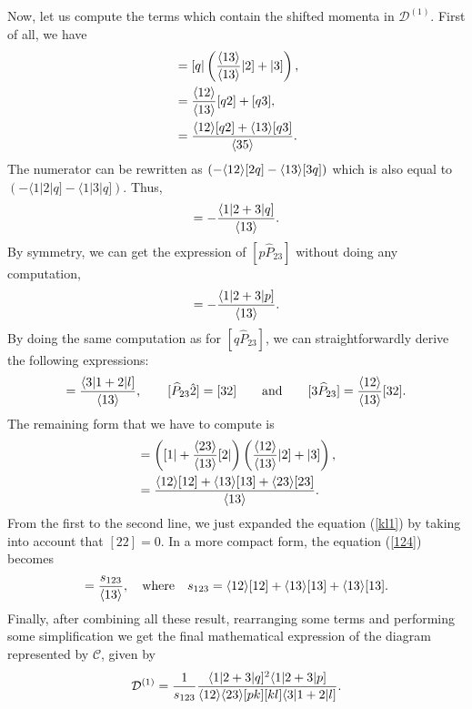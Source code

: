 Now, let us compute the terms which contain the shifted momenta in $\mathcal{D}^{(1)}$. First of all, we have
\begin{align}
[q\widehat{P}_{23}] &= [q\vert \left(\frac{\braket{13}}{\braket{13}} \vert 2]+\vert 3]\right), \nonumber \\ 
&= \frac{\braket{12}}{\braket{13}} [q2]+[q3],  \nonumber \\
&= \frac{\braket{12}[q2]+\braket{13}[q3]}{\braket{35}}. 
\end{align}
The numerator can be rewritten as $(-\langle12\rangle[2q]-\langle13\rangle[3q])$ which is also equal to $(-\langle 1\vert 2\vert q]-\langle 1\vert 3 \vert q] )$. Thus,
\begin{equation}
[q\widehat{P}_{23}]=-\frac{\langle 1 \vert 2+3 \vert q]}{\braket{13}}.
\end{equation}
By symmetry, we can get the expression of $[p\widehat{P}_{23}]$ without doing any computation,
\begin{eqnarray}
[p\widehat{P}_{23}]=-\frac{\langle 1 \vert 2+3 \vert p]}{\braket{13}}.
\end{eqnarray}
By doing the same computation as for $[q\widehat{P}_{23}]$, we can straightforwardly derive the following expressions:
\begin{equation}
[l\hat{1}]=\frac{\langle 3\vert 1+2\vert l]}{\braket{13}}, \qquad [\widehat{P}_{23} \hat{2}]=[32] \qquad \text{and} \qquad [3\widehat{P}_{23}]=\frac{\braket{12}}{\braket{13}}[32].
\end{equation}
The remaining form that we have to compute is 
\begin{align}
[\hat{1} \widehat{P}_{23}] &=\left([1\vert +\frac{\braket{23}}{\braket{13}}[2\vert\right) \left(\frac{\braket{12}}{\braket{13}} \vert 2 ] + \vert 3]\right), \label{kl1} \\
&= \frac{\braket{12}[12]+\braket{13}[13]+\braket{23}[23]}{\braket{13}}. \label{124}
\end{align}
From the first to the second line, we just expanded the equation (\ref{kl1}) by taking into account that $[22]=0$. In a more compact form, the equation (\ref{124}) becomes
\begin{equation}
[\hat{1} \widehat{P}_{23}]=\frac{s_{123}}{\braket{13}}, \quad \text{where} \quad s_{123}= \braket{12}[12]+\braket{13}[13]+\braket{13}[13].
\end{equation}
Finally, after combining all these result, rearranging some terms and performing some simplification we get the final mathematical expression of the diagram represented by $\mathcal{C}$, given by
\begin{equation}
\mathcal{D}^{(1)}=\frac{1}{s_{123}} \frac{\langle 1\vert 2+3\vert q]^2 \langle 1\vert 2+3\vert p]}{\langle12\rangle \langle23\rangle [pk] [kl] \langle 3\vert 1+2\vert l]}. 
\end{equation}

